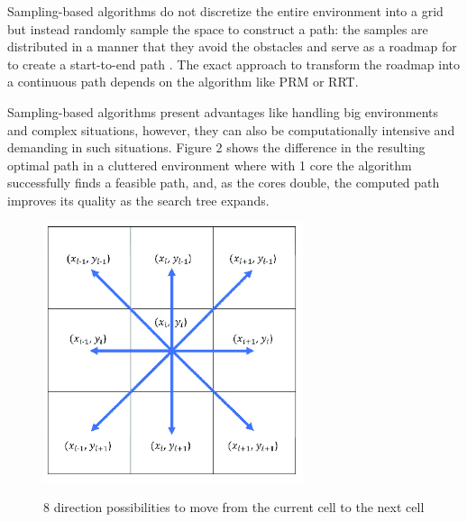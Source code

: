 Sampling-based algorithms do not discretize the entire environment into a grid but instead randomly sample 
the space to construct a path: the samples are distributed in a manner that they avoid the obstacles 
and serve as a roadmap for to create a start-to-end path \cite{R15}. The exact approach to transform the 
roadmap into a continuous path depends on the algorithm like PRM or RRT. 

Sampling-based algorithms present advantages like handling big environments and complex situations, 
however, they can also be computationally intensive and demanding in such situations. 
Figure 2 shows the difference in the resulting optimal path in a cluttered environment where with 
1 core the algorithm successfully finds a feasible path, and, as the cores double, the computed path 
improves its quality as the search tree expands.  

\begin{figure}[H]
    \begin{center}
       \includegraphics[width=3in]{images/Chap1/8dirs_pathPlan.png}\\
       \caption{8 direction possibilities to move from the current cell to the next cell \cite{R14}}
       \label{direction possibilities}
       \end{center}
\end{figure}

